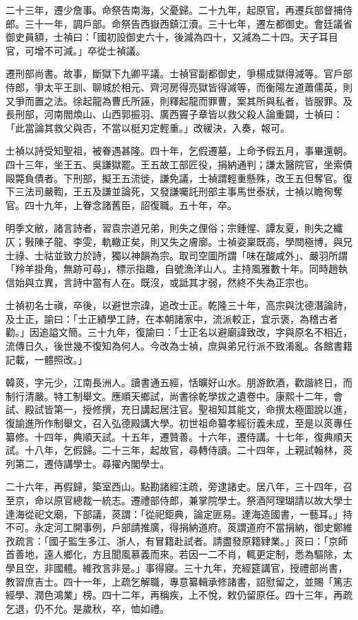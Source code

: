 \begin{pinyinscope}
二十三年，遷少詹事。命祭告南海，父憂歸。二十九年，起原官，再遷兵部督捕侍郎。三十一年，調戶部。命祭告西嶽西鎮江瀆。三十七年，遷左都御史。會廷議省御史員額，士禎曰：「國初設御史六十，後減為四十，又減為二十四。天子耳目官，可增不可減。」卒從士禎議。

遷刑部尚書。故事，斷獄下九卿平議。士禎官副都御史，爭楊成獄得減等。官戶部侍郎，爭太平王訓、聊城於相元、齊河房得亮獄皆得減等，而衡陽左道蕭儒英，則又爭而置之法。徐起龍為曹氏所誣，則釋起龍而罪曹，案其所與私者，皆服罪。及長刑部，河南閻煥山、山西郭振羽、廣西竇子章皆以救父殺人論重闢，士禎曰：「此當論其救父與否，不當以梃刃定輕重。」改緩決，入奏，報可。

士禎以詩受知聖祖，被眷遇甚隆。四十年，乞假遷墓，上命予假五月，事畢還朝。四十三年，坐王五、吳謙獄罷。王五故工部匠役，捐納通判；謙太醫院官，坐索債毆斃負債者。下刑部，擬王五流徙，謙免議，士禎謂輕重懸殊，改王五但奪官。復下三法司嚴鞫，王五及謙並論死，又發謙囑託刑部主事馬世泰狀，士禎以瞻徇奪官。四十九年，上眷念諸舊臣，詔復職。五十年，卒。

明季文敝，諸言詩者，習袁宗道兄弟，則失之俚俗；宗鍾惺、譚友夏，則失之纖仄；斅陳子龍、李雯，軌轍正矣，則又失之膚廓。士禎姿稟既高，學問極博，與兄士祿、士祜並致力於詩，獨以神韻為宗。取司空圖所謂「味在酸咸外」、嚴羽所謂「羚羊掛角，無跡可尋」，標示指趣，自號漁洋山人。主持風雅數十年。同時趙執信始與立異，言詩中當有人在。既沒，或詆其才弱，然終不失為正宗也。

士禎初名士禛，卒後，以避世宗諱，追改士正。乾隆三十年，高宗與沈德潛論詩，及士正，諭曰：「士正績學工詩，在本朝諸家中，流派較正，宜示褒，為稽古者勸。」因追謚文簡。三十九年，復諭曰：「士正名以避廟諱致改，字與原名不相近，流傳日久，後世幾不復知為何人。今改為士禎，庶與弟兄行派不致淆亂。各館書籍記載，一體照改。」

韓菼，字元少，江南長洲人。讀書通五經，恬曠好山水。朋游飲酒，歡諧終日，而制行清嚴。特工制舉文。應順天鄉試，尚書徐乾學拔之遺卷中。康熙十二年，會試、殿試皆第一，授修撰，充日講起居注官。聖祖知其能文，命撰太極圖說以進，復諭進所作制舉文，召入弘德殿講大學。初世祖命纂孝經衍義未成，至是以菼專任纂修。十四年，典順天試。十五年，遷贊善。十六年，遷侍講。十七年，復典順天試。十八年，乞假歸。二十三年，起故官，尋轉侍讀。二十四年，上親試翰林，菼列第二，遷侍講學士。尋擢內閣學士。

二十六年，再假歸，築室西山。點勘諸經注疏，旁逮諸史。居八年，三十四年，召至京，命以原官總裁一統志。遷禮部侍郎，兼掌院學士。祭酒阿理瑚請以故大學士達海從祀文廟，下部議，菼謂：「從祀鉅典，論定匪易。達海造國書，一藝耳。」持不可。永定河工開事例，戶部請推廣，得捐納道府。菼謂道府不當捐納，御史鄭維孜疏言：「國子監生多江、浙人，有冒籍赴試者。請盡發原籍肄業。」菼曰：「京師首善地，遠人鄉化，方且聞風慕義而來。若因一二不肖，輒更定制，悉為驅除，太學且空，非國體。維孜言非是。」事得寢。三十九年，充經筵講官，授禮部尚書，教習庶吉士。四十一年，上疏乞解職，專意纂輯承修諸書，詔慰留之，並賜「篤志經學、潤色鴻業」榜。四十二年，再稱疾，上不悅，敕仍留原任。四十三年，再疏乞退，仍不允。是歲秋，卒，恤如禮。


\end{pinyinscope}
